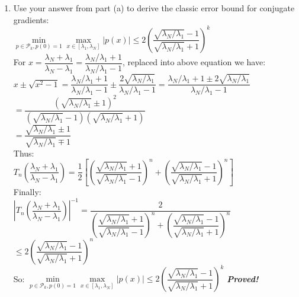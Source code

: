 \documentclass[14pt,a4paper]{article}
\begin{document}
\begin{enumerate}
	\label{4d}
	\item Use your answer from part (a) to derive the classic error bound for conjugate gradients:\\
	\hspace*{2.5cm} $ \min\limits_{p \in \mathcal{P}_k,p(0) =1} \max\limits_{x\in[\lambda_1,\lambda_N]} |p(x)| \leq 2\left( \dfrac{\sqrt{\lambda_N/\lambda_1}-1}{\sqrt{\lambda_N/\lambda_1}+1}\right)^k $\\
	For $x = \dfrac{\lambda_N + \lambda_1}{\lambda_N - \lambda_1} = \dfrac{\lambda_N/\lambda_1 +1}{\lambda_N/\lambda_1 -1}$, replaced into above equation we have:\\
	$x \pm \sqrt{x^2 -1} = \dfrac{\lambda_N/\lambda_1 +1}{\lambda_N/\lambda_1 -1} \pm \dfrac{2\sqrt{\lambda_N/\lambda_1}}{\lambda_N/\lambda_1 -1} = \dfrac{\lambda_N/\lambda_1 + 1 \pm 2\sqrt{\lambda_N/\lambda_1}}{\lambda_N/\lambda_1 -1}$\\
	\hspace*{7.2cm} $ = \dfrac{(\sqrt{\lambda_N/\lambda_1} \pm 1)^2}{(\sqrt{\lambda_N/\lambda_1}-1)(\sqrt{\lambda_N/\lambda_1}+1)}$\\
	\hspace*{7.2cm} $ = \dfrac{\sqrt{\lambda_N/\lambda_1} \pm 1}{\sqrt{\lambda_N/\lambda_1} \mp 1} $\\
	Thus: \\ 
	\hspace*{1cm} $T_n\left( \dfrac{\lambda_N + \lambda_1}{\lambda_N - \lambda_1} \right) = \dfrac{1}{2}\left[ \left(\dfrac{\sqrt{\lambda_N/\lambda_1}+1}{\sqrt{\lambda_N/\lambda_1} -1}\right)^n + \left(\dfrac{\sqrt{\lambda_N/\lambda_1}-1}{\sqrt{\lambda_N/\lambda_1} +1}\right)^n \right]$ \\
	Finally:\\
	\hspace*{1cm} $\left|T_n\left(\dfrac{\lambda_N+\lambda_1}{\lambda_N-\lambda_1}\right)\right|^{-1} = \dfrac{2}{\left(\dfrac{\sqrt{\lambda_N/\lambda_1}+1}{\sqrt{\lambda_N/\lambda_1} -1}\right)^n + \left(\dfrac{\sqrt{\lambda_N/\lambda_1}-1}{\sqrt{\lambda_N/\lambda_1} +1}\right)^n}$\\
	\hspace*{4.6cm} $\leq 2\left(\dfrac{\sqrt{\lambda_N/\lambda_1}-1}{\sqrt{\lambda_N/\lambda_1} +1}\right)^n $\\
	So: $ \min\limits_{p \in \mathcal{P}_k,p(0) =1} \max\limits_{x\in[\lambda_1,\lambda_N]} |p(x)| \leq 2\left( \dfrac{\sqrt{\lambda_N/\lambda_1}-1}{\sqrt{\lambda_N/\lambda_1}+1}\right)^k $ \hspace{1cm} \textbf{\textit{Proved!}}\\
	

\end{enumerate}
\end{document}
